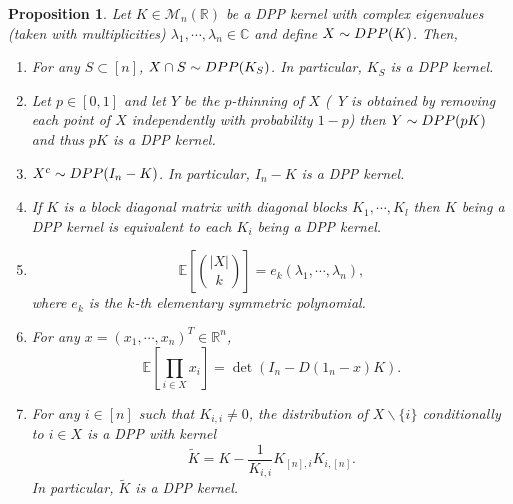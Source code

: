 \documentclass{article}
\numberwithin{equation}{section}
\renewcommand{\tilde}{\widetilde}
\newcommand{\bC}{\mathbb{C}}
\newcommand{\bE}{\mathbb{E}}
\newcommand{\bR}{\mathbb{R}}
\newcommand{\DPP}{\textnormal{DPP}}
\theoremstyle{plain}
\newtheorem{proposition}{Proposition}[section]
\begin{document}
\begin{proposition}\label{prop: Already_proved}
Let $K\in\mathcal{M}_n(\bR)$ be a DPP kernel with complex eigenvalues (taken with multiplicities) $\lambda_1,\cdots,\lambda_n\in\bC$ and define $X\sim \DPP(K)$. Then,
\begin{enumerate}[label=(\alph*)]
\item For any $S\subset [n]$, $X\cap S\sim \DPP(K_S)$. In particular, $K_S$ is a DPP kernel. \label{subprop: Marginal}
\item Let $p\in[0, 1]$ and let $Y$ be the $p$-thinning of $X$ (~$Y$ is  obtained by removing each point of $X$ independently with probability $1-p$) then $Y\sim \DPP(pK)$ and thus $pK$ is a DPP kernel. \label{subprop: Thinning}
\item $X^c\sim \DPP(I_n - K)$. In particular, $I_n - K$ is a DPP kernel. \label{subprop: Complement}
\item If $K$ is a block diagonal matrix with diagonal blocks $K_1,\cdots, K_l$ then $K$ being a DPP kernel is equivalent to each $K_i$ being a DPP kernel. \label{subprop: Block_diag}
\item 
\[\bE\left[\binom{|X|}{k}\right]=e_k(\lambda_1,\cdots,\lambda_n),\]
where $e_k$ is the $k$-th elementary symmetric polynomial. \label{subprop: Moments_nbpoint}
\item For any $x=(x_1,\cdots, x_n)^T\in\bR^n$,
\[\bE\left[\prod_{i\in X} x_i\right]=\det(I_n-D(1_n-x)K).\]
\label{subprop: Laplace}
\item For any $i\in [n]$ such that $K_{i,i}\neq 0$, the distribution of $X\backslash \{i\}$ conditionally to $i\in X$ is a DPP with kernel
\begin{equation}\label{eq: conditional_K}
\tilde K = K-\frac{1}{K_{i,i}}K_{[n], i}K_{i, [n]}.
\end{equation}
In particular, $\tilde K$ is a DPP kernel. \label{subprop: Cond_point}
\end{enumerate}
\end{proposition}
\end{document}
